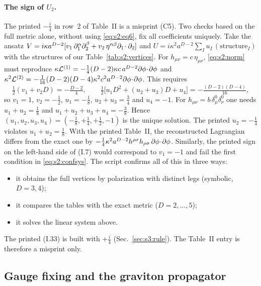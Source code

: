 \documentclass[aps,prd,onecolumn,10pt,nofootinbib,floatfix]{revtex4-2}
\newcommand{\eqI}[1]{(I.#1)}
\begin{document}
\paragraph*{The sign of $U_2$.}
The printed $-\tfrac i4$ in row~2 of Table~II is a misprint (C5). Two checks
based on the full metric alone, without using \eqref{eq:s2:eq6}, fix all
coefficients uniquely. Take the ansatz
$V=i\kappa a^{D-2}[v_1\,\partial_1^\alpha\partial_2^\beta+v_2\,\eta^{\alpha\beta}\partial_1\!\cdot\partial_2]$
and $U=i\kappa^2a^{D-2}\sum_Iu_I\,(\text{structure}_I)$ with the structures
of our Table~\ref{tab:s2:vertices}. For $h_{\mu\nu}=c\,\eta_{\mu\nu}$,
\eqref{eq:s2:norm} must reproduce
$\kappa\mathcal L^{(1)}=-\tfrac14(D-2)\kappa c\,a^{D-2}\partial\phi\!\cdot\!\partial\phi$ and
$\kappa^2\mathcal L^{(2)}=-\tfrac1{16}(D-2)(D-4)\kappa^2c^2a^{D-2}\partial\phi\!\cdot\!\partial\phi$.
This requires
\begin{equation}
\tfrac12(v_1+v_2D)=-\tfrac{D-2}{4},\qquad
\tfrac12\big[u_1D^2+(u_2+u_3)D+u_4\big]=-\tfrac{(D-2)(D-4)}{16},
\label{eq:s2:confsys}
\end{equation}
so $v_1=1$, $v_2=-\tfrac12$, $u_1=-\tfrac18$, $u_2+u_3=\tfrac34$ and $u_4=-1$.
For $h_{\mu\nu}=b\,\delta^0_\mu\delta^0_\nu$ one needs $u_1+u_2=\tfrac18$ and
$u_1+u_2+u_3+u_4=-\tfrac38$. Hence $(u_1,u_2,u_3,u_4)=(-\tfrac18,+\tfrac14,+\tfrac12,-1)$
is the unique solution. The printed $u_2=-\tfrac14$ violates
$u_1+u_2=\tfrac18$. With the printed Table~II, the reconstructed
Lagrangian differs from the exact one by
$-\tfrac14\kappa^2a^{D-2}h^{\rho\sigma}h_{\rho\sigma}\,\partial\phi\!\cdot\!\partial\phi$. Similarly,
the printed sign on the left-hand side of \eqI{7} would correspond to $v_1=-1$
and fail the first condition in \eqref{eq:s2:confsys}. The script
 confirms all of this in
three ways:
\begin{itemize}
\item[(A)] it obtains the full vertices by polarization with distinct legs
(symbolic, $D=3,4$);
\item[(B)] it compares the tables with the exact metric ($D=2,\dots,5$);
\item[(C)] it solves the linear system above.
\end{itemize}
The printed \eqI{33} is built with $+\tfrac i4$ (Sec.~\ref{sec:s3:rule}).
The Table~II entry is therefore a misprint only.

\subsection{Gauge fixing and the graviton propagator}
\label{sec:s2:graviton}
\end{document}

